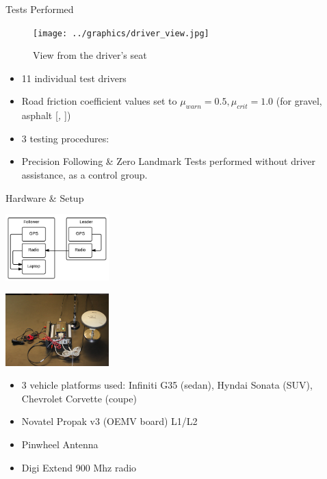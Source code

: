 \documentclass{beamer}
\newcommand{\citeitem}[1]{[\emph{\Citeauthor*{#1}, \citeyear{#1} }]}
\begin{document}
  \begin{frame}{Tests Performed}
    \begin{figure}[ht] \centering
      \texttt{[image: ../graphics/driver\_view.jpg]}
      \caption{\scriptsize View from the driver's seat}
    \end{figure}
    \vspace{-20pt}
    \begin{itemize} \footnotesize
      \item 11 individual test drivers
      \item Road friction coefficient values set to $\mu_{warn}=0.5,\mu_{crit}=1.0$ (for gravel, asphalt \citeitem{mu})
      \item 3 testing procedures: 
      \item Precision Following \& Zero Landmark Tests performed without driver assistance, as a control group.
    \end{itemize}
  \end{frame}

  \begin{frame}{Hardware \& Setup}
      \begin{minipage}{0.45\textwidth}
        \centering
        \includegraphics[width=4cm]{../graphics/hardware_flow.png}
      \end{minipage}
      \begin{minipage}{0.45\textwidth}
        \centering
        \includegraphics[width=4cm]{../graphics/lead_hardware.jpg}
      \end{minipage}
      \vspace{-20pt}
      \begin{itemize}
        \item 3 vehicle platforms used: Infiniti G35 (sedan), Hyndai Sonata (SUV), Chevrolet Corvette (coupe)
        \item Novatel Propak v3 (OEMV board) L1/L2
        \item Pinwheel Antenna
        \item Digi Extend 900 Mhz radio
      \end{itemize}
  \end{frame}
\end{document}
